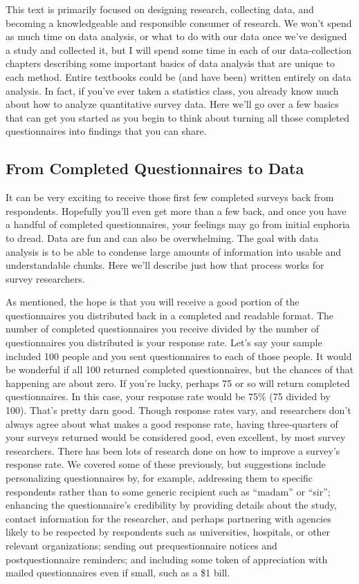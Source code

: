 This text is primarily focused on designing research, collecting data, and becoming a knowledgeable and responsible consumer of research. We won’t spend as much time on data analysis, or what to do with our data once we’ve designed a study and collected it, but I will spend some time in each of our data-collection chapters describing some important basics of data analysis that are unique to each method. Entire textbooks could be (and have been) written entirely on data analysis. In fact, if you’ve ever taken a statistics class, you already know much about how to analyze quantitative survey data. Here we’ll go over a few basics that can get you started as you begin to think about turning all those completed questionnaires into findings that you can share.

\subsection{From Completed Questionnaires to Data}

It can be very exciting to receive those first few completed surveys back from respondents. Hopefully you’ll even get more than a few back, and once you have a handful of completed questionnaires, your feelings may go from initial euphoria to dread. Data are fun and can also be overwhelming. The goal with data analysis is to be able to condense large amounts of information into usable and understandable chunks. Here we’ll describe just how that process works for survey researchers.

As mentioned, the hope is that you will receive a good portion of the questionnaires you distributed back in a completed and readable format. The number of completed questionnaires you receive divided by the number of questionnaires you distributed is your response rate. Let’s say your sample included 100 people and you sent questionnaires to each of those people. It would be wonderful if all 100 returned completed questionnaires, but the chances of that happening are about zero. If you’re lucky, perhaps 75 or so will return completed questionnaires. In this case, your response rate would be 75\% (75 divided by 100). That’s pretty darn good. Though response rates vary, and researchers don’t always agree about what makes a good response rate, having three-quarters of your surveys returned would be considered good, even excellent, by most survey researchers. There has been lots of research done on how to improve a survey’s response rate. We covered some of these previously, but suggestions include personalizing questionnaires by, for example, addressing them to specific respondents rather than to some generic recipient such as “madam” or “sir”; enhancing the questionnaire’s credibility by providing details about the study, contact information for the researcher, and perhaps partnering with agencies likely to be respected by respondents such as universities, hospitals, or other relevant organizations; sending out prequestionnaire notices and postquestionnaire reminders; and including some token of appreciation with mailed questionnaires even if small, such as a \$1 bill.

